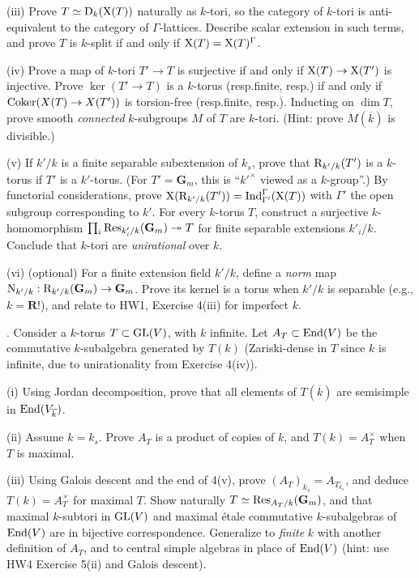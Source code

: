 \documentclass[10pt]{amsart}
\def\Coker{\mathop{\rm Coker}}
\begin{document}
(iii) Prove $T \simeq {\rm{D}}_k({\rm{X}}(T))$ naturally as $k$-tori, so 
the category of $k$-tori is anti-equivalent to the category of $\Gamma$-lattices. Describe
scalar extension in such terms, and prove $T$ is $k$-split if and only if
${\rm{X}}(T) = {\rm{X}}(T)^{\Gamma}$. 

(iv) Prove a map of
$k$-tori $T' \rightarrow T$ is surjective if and only if
${\rm{X}}(T) \rightarrow {\rm{X}}(T')$ is injective. 
Prove $\ker(T' \rightarrow T)$ is a $k$-torus (resp.\:finite, resp.) if and only if $\Coker(X(T) \rightarrow
X(T'))$ is torsion-free (resp.\:finite, resp.).  Inducting on $\dim T$, prove
smooth {\em connected} $k$-subgroups $M$ of $T$ are $k$-tori. (Hint: prove
$M(\overline{k})$ is divisible.) 

(v) If $k'/k$ is a finite separable subextension of $k_s$, prove that
${\rm{R}}_{k'/k}(T')$ is a $k$-torus if $T'$ is a $k'$-torus. (For $T' = \mathbf{G}_m$, this is
``${k'}^{\times}$ viewed as a $k$-group''.)  
By functorial considerations,  
prove ${\rm{X}}({\rm{R}}_{k'/k}(T')) = {\rm{Ind}}_{\Gamma'}^{\Gamma}({\rm{X}}(T))$
with $\Gamma'$ the open subgroup corresponding to $k'$.
For every $k$-torus $T$, construct a surjective $k$-homomorphism
$\prod_i {\rm{Res}}_{k'_i/k}({\mathbf{G}}_m) \twoheadrightarrow T$ 
for finite separable extensions $k'_i/k$.
Conclude that $k$-tori are {\em unirational} over $k$. 

(vi) (optional) For a finite extension field $k'/k$, define a {\em norm} map
${\rm{N}}_{k'/k}:{\rm{R}}_{k'/k}(\mathbf{G}_m) \rightarrow {\mathbf{G}}_m$. Prove
its kernel is a torus when $k'/k$ is separable (e.g., $k = \mathbf{R}$!),
and relate to HW1, Exercise 4(iii) for imperfect $k$. 

\medskip{}.  Consider a $k$-torus $T \subset {\rm{GL}}(V)$, with $k$ infinite. 
Let $A_T \subset {\rm{End}}(V)$ be the commutative $k$-subalgebra generated by $T(k)$
(Zariski-dense in $T$ since $k$ is infinite, due to unirationality from Exercise 4(iv)). 

(i) Using Jordan decomposition, prove that all elements of $T(\overline{k})$ are semisimple in 
${\rm{End}}(V_{\overline{k}})$. 

(ii) Assume $k = k_s$.  Prove $A_T$ is a product of copies of $k$, and 
 $T(k) = A_T^{\times}$ when $T$ is maximal.

(iii) Using Galois descent and the end of  4(v), prove
$(A_T)_{k_s} = A_{T_{k_s}}$, and deduce 
$T(k) = A_T^{\times}$ for maximal $T$. Show naturally
$T \simeq {\rm{Res}}_{A_T/k}(\mathbf{G}_m)$, and that 
maximal $k$-subtori in ${\rm{GL}}(V)$ and maximal \'etale commutative $k$-subalgebras
of ${\rm{End}}(V)$ are in bijective correspondence.  Generalize to {\em finite} $k$ with another definition of 
$A_T$, and to central simple algebras  in place of ${\rm{End}}(V)$ (hint: use HW4 Exercise 5(ii) and Galois descent).
\end{document}
